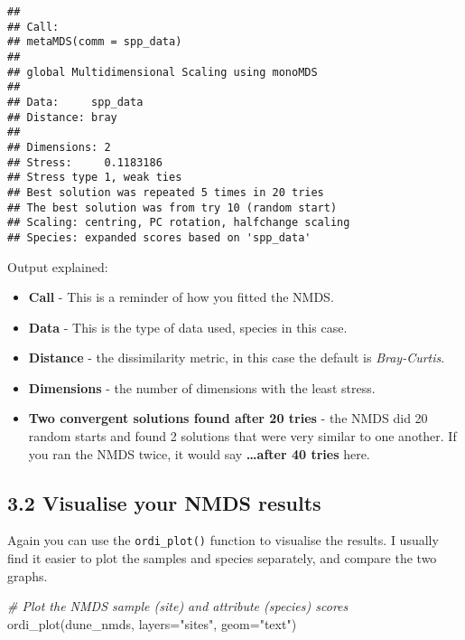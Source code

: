 \documentclass[
]{article}
\newenvironment{Shaded}{\begin{snugshade}}{\end{snugshade}}
\newcommand{\AttributeTok}[1]{\textcolor[rgb]{0.77,0.63,0.00}{#1}}
\newcommand{\CommentTok}[1]{\textcolor[rgb]{0.56,0.35,0.01}{\textit{#1}}}
\newcommand{\FunctionTok}[1]{\textcolor[rgb]{0.00,0.00,0.00}{#1}}
\newcommand{\NormalTok}[1]{#1}
\newcommand{\StringTok}[1]{\textcolor[rgb]{0.31,0.60,0.02}{#1}}
\providecommand{\tightlist}{%
  \setlength{\itemsep}{0pt}\setlength{\parskip}{0pt}}
\begin{document}
\begin{verbatim}
## 
## Call:
## metaMDS(comm = spp_data) 
## 
## global Multidimensional Scaling using monoMDS
## 
## Data:     spp_data 
## Distance: bray 
## 
## Dimensions: 2 
## Stress:     0.1183186 
## Stress type 1, weak ties
## Best solution was repeated 5 times in 20 tries
## The best solution was from try 10 (random start)
## Scaling: centring, PC rotation, halfchange scaling 
## Species: expanded scores based on 'spp_data'
\end{verbatim}

Output explained:

\begin{itemize}
\tightlist
\item
  \textbf{Call} - This is a reminder of how you fitted the NMDS.
\item
  \textbf{Data} - This is the type of data used, species in this case.
\item
  \textbf{Distance} - the dissimilarity metric, in this case the default
  is \emph{Bray-Curtis}.
\item
  \textbf{Dimensions} - the number of dimensions with the least stress.
\item
  \textbf{Two convergent solutions found after 20 tries} - the NMDS did
  20 random starts and found 2 solutions that were very similar to one
  another. If you ran the NMDS twice, it would say \textbf{\ldots after
  40 tries} here.
\end{itemize}

\hypertarget{visualise-your-nmds-results}{%
\subsection{3.2 Visualise your NMDS
results}\label{visualise-your-nmds-results}}

Again you can use the \texttt{ordi\_plot()} function to visualise the
results. I usually find it easier to plot the samples and species
separately, and compare the two graphs.

\begin{Shaded}
\begin{Highlighting}[]
\CommentTok{\# Plot the NMDS sample (site) and attribute (species) scores}
\FunctionTok{ordi\_plot}\NormalTok{(dune\_nmds, }\AttributeTok{layers=}\StringTok{"sites"}\NormalTok{, }\AttributeTok{geom=}\StringTok{"text"}\NormalTok{)}
\end{Highlighting}
\end{Shaded}
\end{document}
